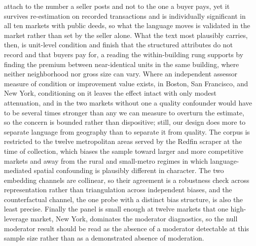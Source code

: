attach to the number a seller posts and not to the one a buyer pays, yet it survives
re-estimation on recorded transactions and is individually significant in all ten
markets with public deeds, so what the language moves is validated in the market
rather than set by the seller alone. What the text most plausibly carries, then, is
unit-level condition and finish that the structured attributes do not record and that
buyers pay for, a reading the within-building rung supports by finding the premium
between near-identical units in the same building, where neither neighborhood nor
gross size can vary. Where
an independent assessor measure of condition or improvement value exists, in Boston,
San Francisco, and New York, conditioning on it leaves the effect intact with only
modest attenuation, and in the two markets without one a quality confounder would
have to be several times stronger than any we can measure to overturn the estimate,
so the concern is bounded rather than dispositive; still, our design does more to
separate language from geography than to separate it from quality. The corpus is restricted to the
twelve metropolitan areas served by the Redfin scraper at the time of collection,
which biases the sample toward larger and more competitive markets and away from
the rural and small-metro regimes in which language-mediated spatial confounding
is plausibly different in character. The two embedding channels are collinear, so
their agreement is a robustness check across representation rather than
triangulation across independent biases, and the counterfactual channel, the one
probe with a distinct bias structure, is also the least precise. Finally
the panel is small enough at twelve markets that one high-leverage market, New
York, dominates the moderator diagnostics, so the null moderator result should be
read as the absence of a moderator detectable at this sample size rather than as a
demonstrated absence of moderation.

